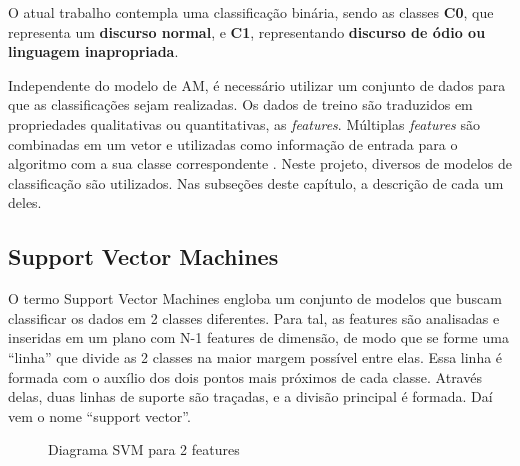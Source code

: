 O atual trabalho contempla uma classificação binária, sendo as classes \textbf{C0}, que representa um \textbf{discurso normal}, e \textbf{C1}, representando \textbf{discurso de ódio ou linguagem inapropriada}.

Independente do modelo de AM, é necessário utilizar um conjunto de dados para que as classificações sejam realizadas. Os dados de treino são traduzidos em propriedades qualitativas ou quantitativas, as \textit{features}. Múltiplas \textit{features} são combinadas em um vetor e utilizadas como informação de entrada para o algoritmo com a sua classe correspondente \cite{Lundborg_2017}. Neste projeto, diversos de modelos de classificação são utilizados. Nas subseções deste capítulo, a descrição de cada um deles.

\subsection{Support Vector Machines}

O termo Support Vector Machines engloba um conjunto de modelos que buscam classificar os dados em 2 classes diferentes. Para tal, as features são analisadas e inseridas em um plano com N-1 features de dimensão, de modo que se forme uma “linha” que divide as 2 classes na maior margem possível entre elas. Essa linha é formada com o auxílio dos dois pontos mais próximos de cada classe. Através delas, duas linhas de suporte são traçadas, e a divisão principal é formada. Daí vem o nome “support vector”.

\begin{figure}[!htb]
    \caption{\label{fig:svm_example} Diagrama SVM para 2 features}
\end{figure}

